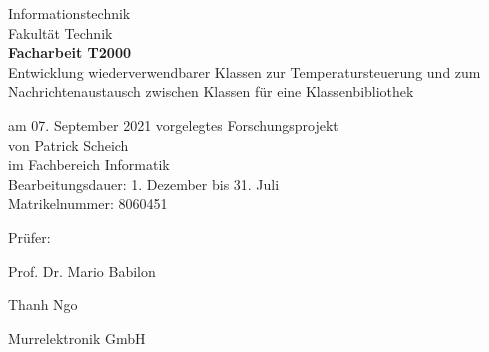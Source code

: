 \begin{titlepage}
\begin{center}
        \vspace{1cm} %
        \huge
        Informationstechnik\\
        Fakultät Technik\\
        \vspace{1cm} %
        \huge
        \textbf{Facharbeit T2000} \\
        \vspace{1cm} %
        \Large
        Entwicklung wiederverwendbarer Klassen zur Temperatursteuerung und zum Nachrichtenaustausch zwischen  Klassen für eine Klassenbibliothek  \\
        \vspace{0.75cm} %
    \end{center}    
    \normalsize
    \vfill %
    am 07. September 2021 vorgelegtes Forschungsprojekt \\
    von Patrick Scheich \\
    im Fachbereich Informatik\\
    Bearbeitungsdauer: 1. Dezember bis 31. Juli\\
    Matrikelnummer: 8060451 \\
    \begin{labeling}{Prüfer: }
        \item[Prüfer:]\tabto{1cm} Prof. Dr. Mario Babilon
        \item
        \item[Betreuer:]\tabto{1cm} Thanh Ngo
        \item[Firma:]\tabto{1cm} Murrelektronik GmbH
    \end{labeling}
\end{titlepage}
